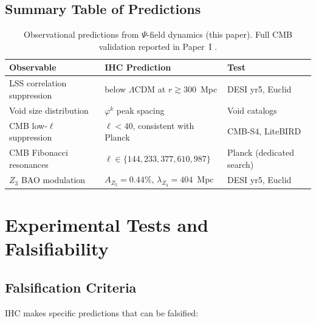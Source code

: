 \subsection{Summary Table of Predictions}

\begin{table}[h]
\centering
\caption{Observational predictions from $\Psi$-field dynamics (this paper).
Full CMB validation reported in Paper~I \citep{Peacock2026a}.}
\begin{tabular}{l p{5cm} p{4cm}}
\toprule
\textbf{Observable} & \textbf{IHC Prediction} & \textbf{Test} \\
\midrule
LSS correlation suppression & below $\Lambda$CDM at $r \gtrsim 300$~Mpc & DESI yr5, Euclid \\
Void size distribution      & $\varphi^k$ peak spacing              & Void catalogs \\
CMB low-$\ell$ suppression  & $\ell < 40$, consistent with Planck    & CMB-S4, LiteBIRD \\
CMB Fibonacci resonances    & $\ell \in \{144, 233, 377, 610, 987\}$ & Planck (dedicated search) \\
$Z_3$ BAO modulation & $A_{Z_3} = 0.44\%$, $\lambda_{Z_3} = 404$~Mpc & DESI yr5, Euclid \\
\bottomrule
\end{tabular}
\end{table}

\section{Experimental Tests and Falsifiability}

\subsection{Falsification Criteria}

IHC makes specific predictions that can be falsified:

